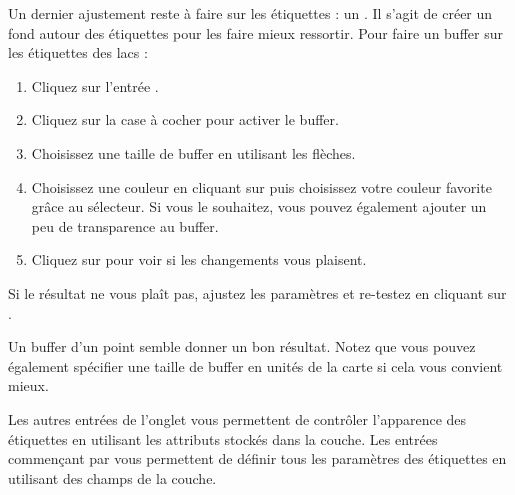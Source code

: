 Un dernier ajustement reste à faire sur les étiquettes : un . Il s'agit de créer un fond autour des étiquettes pour les faire mieux ressortir. Pour faire un buffer sur les étiquettes des lacs :

\begin{enumerate}
\item Cliquez sur l'entrée .
\item Cliquez sur la case à cocher  pour activer le buffer.
\item Choisissez une taille de buffer en utilisant les flèches.
\item Choisissez une couleur en cliquant sur  puis choisissez votre couleur favorite grâce au sélecteur. Si vous le souhaitez, vous pouvez également ajouter un peu de transparence au buffer.
\item Cliquez sur  pour voir si les changements vous plaisent.
\end{enumerate}

Si le résultat ne vous plaît pas, ajustez les paramètres et re-testez en cliquant sur .

Un buffer d'un point semble donner un bon résultat. Notez que vous pouvez également spécifier une taille de buffer en unités de la carte si cela vous convient mieux.

Les autres entrées de l'onglet  vous permettent de contrôler l'apparence des étiquettes en utilisant les attributs stockés dans la couche. Les entrées commençant par  vous permettent de définir tous les paramètres des étiquettes en utilisant des champs de la couche.

